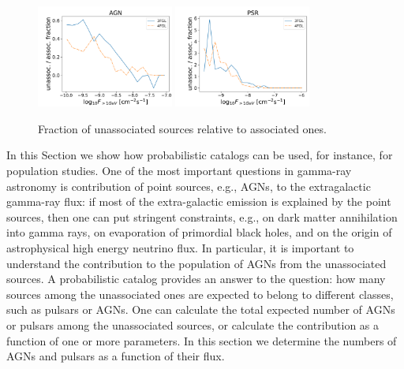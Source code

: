 \begin{figure}[h]
\includegraphics[width=0.4\textwidth]{plots/logN_logS_diff_AGN_unweighted.pdf}
\includegraphics[width=0.4\textwidth]{plots/logN_logS_diff_PSR_unweighted.pdf}
\caption{Fraction of unassociated sources relative to associated ones.}  
\label{fig:unass_vs_ass_frac}
\end{figure}



In this Section we show how probabilistic catalogs can be used, for instance, for population studies.
One of the most important questions in gamma-ray astronomy is contribution of point sources, e.g., AGNs, to the extragalactic gamma-ray
flux:
if most of the extra-galactic emission is explained by the point sources, then one can put stringent constraints, e.g., on 
dark matter annihilation into gamma rays, on evaporation of primordial black holes, and on the origin of astrophysical high energy neutrino flux.
In particular, it is important to understand the contribution to the population of AGNs from the unassociated sources.
A probabilistic catalog provides an answer to the question: how many sources among the unassociated ones are expected to belong to different classes, such as pulsars or AGNs. 
One can calculate the total expected number of AGNs or pulsars among the unassociated sources, or calculate the contribution as a function of one or more parameters.
In this section we determine the numbers of AGNs and pulsars as a function of their flux.


